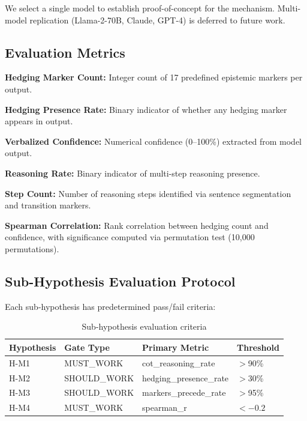 We select a single model to establish proof-of-concept for the mechanism. Multi-model replication (Llama-2-70B, Claude, GPT-4) is deferred to future work.

\subsection{Evaluation Metrics}

\textbf{Hedging Marker Count:} Integer count of 17 predefined epistemic markers per output.

\textbf{Hedging Presence Rate:} Binary indicator of whether any hedging marker appears in output.

\textbf{Verbalized Confidence:} Numerical confidence (0--100\%) extracted from model output.

\textbf{Reasoning Rate:} Binary indicator of multi-step reasoning presence.

\textbf{Step Count:} Number of reasoning steps identified via sentence segmentation and transition markers.

\textbf{Spearman Correlation:} Rank correlation between hedging count and confidence, with significance computed via permutation test (10,000 permutations).

\subsection{Sub-Hypothesis Evaluation Protocol}

Each sub-hypothesis has predetermined pass/fail criteria:

\begin{table}[h]
\centering
\begin{tabular}{llll}
\toprule
Hypothesis & Gate Type & Primary Metric & Threshold \\
\midrule
H-M1 & MUST\_WORK & cot\_reasoning\_rate & $>$90\% \\
H-M2 & SHOULD\_WORK & hedging\_presence\_rate & $>$30\% \\
H-M3 & SHOULD\_WORK & markers\_precede\_rate & $>$95\% \\
H-M4 & MUST\_WORK & spearman\_r & $< -0.2$ \\
\bottomrule
\end{tabular}
\caption{Sub-hypothesis evaluation criteria}
\label{tab:hypotheses}
\end{table}
